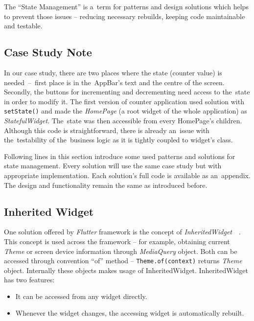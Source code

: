 The ``State Management'' is a~term for patterns and design solutions which helps to prevent those issues -- reducing necessary rebuilds, keeping code maintainable and testable. 
\subsection{Case Study Note}
In our case study, there are two places where the state (counter value) is needed~--~first place is in the~AppBar's text and the centre of the screen. Secondly, the buttons for incrementing and decrementing need access to the~state in order to modify it. The first version of counter application used solution with \verb|setState()| and made the \textit{HomePage} (a root widget of the whole application) as \textit{StatefulWidget}. The~state was then accessible from every HomePage's children. Although this code is straightforward, there is already an~issue with the~testability of the~business logic as it is tightly coupled to widget's class.  

Following lines in this section introduce some used patterns and solutions for state management.  Every solution will use the same case study but with appropriate implementation. Each solution's full code is available as an~appendix. The design and functionality remain the same as introduced before.
\subsection{Inherited Widget}
One solution offered by \textit{Flutter} framework is the concept of \textit{InheritedWidget}~\cite{flutter-inherited-widget}~\cite{notion-widget-didier}. This concept is used across the framework -- for example, obtaining current \textit{Theme} or screen device information through \textit{MediaQuery} object. Both can be accessed through convention ``of'' method -- \verb|Theme.of(context)| returns \textit{Theme} object. Internally these objects makes usage of InheritedWidget. InheritedWidget has two features:

\begin{itemize}
    \item It can be accessed from any widget directly.
    \item Whenever the widget changes, the accessing widget is automatically rebuilt.
\end{itemize}

